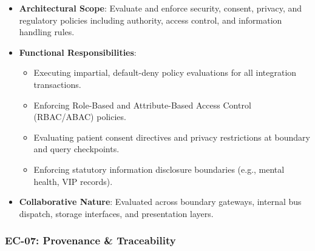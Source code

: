 \begin{itemize}

\item
\textbf{Architectural Scope}: Evaluate and enforce security, consent, privacy, and regulatory policies including authority, access control, and information handling rules.



\item
\textbf{Functional Responsibilities}:


\begin{itemize}

\item
Executing impartial, default-deny policy evaluations for all integration transactions.



\item
Enforcing Role-Based and Attribute-Based Access Control (RBAC/\allowbreak{}ABAC) policies.



\item
Evaluating patient consent directives and privacy restrictions at boundary and query checkpoints.



\item
Enforcing statutory information disclosure boundaries (e.g., mental health, VIP records).



\end{itemize}


\item
\textbf{Collaborative Nature}: Evaluated across boundary gateways, internal bus dispatch, storage interfaces, and presentation layers.



\end{itemize}
\label{rad:enterprise:157}
\subsubsection*{EC-07: Provenance \& Traceability}
\label{rad:enterprise:158}

